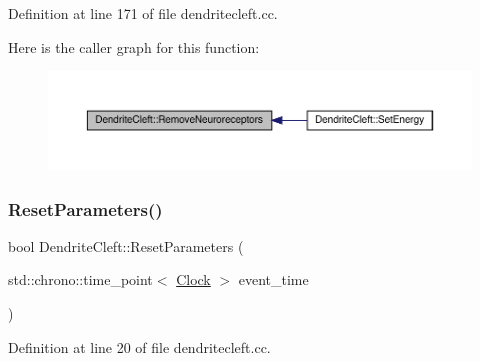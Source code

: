 Definition at line 171 of file dendritecleft.\+cc.

Here is the caller graph for this function\+:
\nopagebreak
\begin{figure}[H]
\begin{center}
\leavevmode
\includegraphics[width=350pt]{class_dendrite_cleft_ac29b12d4abcc47fa298ab9e95f578f0e_icgraph}
\end{center}
\end{figure}
\mbox{\label{class_dendrite_cleft_a3fee388d7023cfb460412e0322244ae2}} 
\subsubsection{\texorpdfstring{Reset\+Parameters()}{ResetParameters()}}
{\footnotesize\ttfamily bool Dendrite\+Cleft\+::\+Reset\+Parameters (\begin{DoxyParamCaption}\item[{std\+::chrono\+::time\+\_\+point$<$ \hyperlink{universe_8h_a0ef8d951d1ca5ab3cfaf7ab4c7a6fd80}{Clock} $>$}]{event\+\_\+time }\end{DoxyParamCaption})}



Definition at line 20 of file dendritecleft.\+cc.

